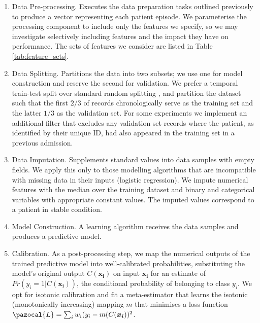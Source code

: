 \documentclass[fleqn,10pt]{wlscirep}
\begin{document}
\begin{enumerate}
    \item Data Pre-processing. Executes the data preparation tasks outlined previously to produce a vector representing each patient episode. We parameterise the processing component to include only the features we specify, so we may investigate selectively including features and the impact they have on performance. The sets of features we consider are listed in Table \ref{tab:feature_sets}.

    \item Data Splitting. Partitions the data into two subsets; we use one for model construction and reserve the second for validation. We prefer a temporal train-test split over standard random splitting \cite{Altman00}, and partition the dataset such that the first $2/3$ of records chronologically serve as the training set and the latter $1/3$ as the validation set. For some experiments we implement an additional filter that excludes any validation set records where the patient, as identified by their unique ID, had also appeared in the training set in a previous admission.

    \item Data Imputation. Supplements standard values into data samples with empty fields. We apply this only to those modelling algorithms that are incompatible with missing data in their inputs (logistic regression). We impute numerical features with the median over the training dataset and binary and categorical variables with appropriate constant values. The imputed values correspond to a patient in stable condition.

    \item Model Construction. A learning algorithm receives the data samples and produces a predictive model.
    \item Calibration. As a post-processing step, we map the numerical outputs of the trained predictive model into well-calibrated probabilities, substituting the model's original output $C(\bm{x_i})$ on input $\bm{x_i}$ for an estimate of $Pr(y_i=1|C(\bm{x_i}))$, the conditional probability of belonging to class $y_i$. We opt for isotonic calibration \cite{Niculescu05} and fit a meta-estimator that learns the isotonic (monotonically increasing) mapping $m$ that minimises a loss function $\pazocal{L} = \sum_i w_i(y_i - m(C(\bm{x_i}))^2$.
\end{enumerate}
\end{document}
